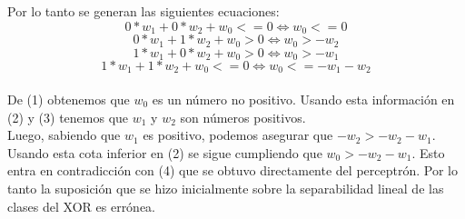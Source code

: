 \documentclass[a4paper]{article}
\begin{document}
Por lo tanto se generan las siguientes ecuaciones:\\
\begin{equation}
0*w_{1} + 0*w_{2} + w_{0} <= 0 \iff w_{0} <= 0
\end{equation}
\begin{equation}
0*w_{1} + 1*w_{2} + w_{0} > 0 \iff w_{0} > -w_{2}
\end{equation}
\begin{equation}
1*w_{1} + 0*w_{2} + w_{0} > 0 \iff w_{0} > -w_{1}
\end{equation}
\begin{equation}
1*w_{1} + 1*w_{2} + w_{0} <= 0 \iff w_{0} <= -w_{1} - w_{2}
\end{equation}\\

De (1) obtenemos que $w_{0}$ es un número no positivo. Usando esta información en (2) y (3) tenemos que $w_{1}$ y $w_{2}$ son números positivos. \\

Luego, sabiendo que $w_{1}$ es positivo, podemos asegurar que $-w_{2} > -w_{2} -w_{1}$. Usando esta cota inferior en (2) se sigue cumpliendo que $w_{0} > -w_{2} - w_{1}$. Esto entra en contradicción con (4) que se obtuvo directamente del perceptrón. Por lo tanto la suposición que se hizo inicialmente sobre la separabilidad lineal de las clases del XOR es errónea.
\end{document}
